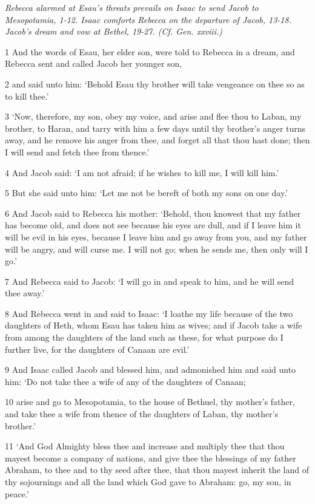 \par \textit{Rebecca alarmed at Esau's threats prevails on Isaac to send Jacob to Mesopotamia, 1-12. Isaac comforts Rebecca on the departure of Jacob, 13-18. Jacob's dream and vow at Bethel, 19-27. (Cf. Gen. xxviii.)}

\par 1 And the words of Esau, her elder son, were told to Rebecca in a dream, and Rebecca sent and called Jacob her younger son,
\par 2 and said unto him: ‘Behold Esau thy brother will take vengeance on thee so as to kill thee.’
\par 3 ‘Now, therefore, my son, obey my voice, and arise and flee thou to Laban, my brother, to Haran, and tarry with him a few days until thy brother's anger turns away, and he remove his anger from thee, and forget all that thou hast done; then I will send and fetch thee from thence.’
\par 4 And Jacob said: ‘I am not afraid; if he wishes to kill me, I will kill him.’
\par 5 But she said unto him: ‘Let me not be bereft of both my sons on one day.’
\par 6 And Jacob said to Rebecca his mother: ‘Behold, thou knowest that my father has become old, and does not see because his eyes are dull, and if I leave him it will be evil in his eyes, because I leave him and go away from you, and my father will be angry, and will curse me. I will not go; when he sends me, then only will I go.’
\par 7 And Rebecca said to Jacob: ‘I will go in and speak to him, and he will send thee away.’
\par 8 And Rebecca went in and said to Isaac: ‘I loathe my life because of the two daughters of Heth, whom Esau has taken him as wives; and if Jacob take a wife from among the daughters of the land such as these, for what purpose do I further live, for the daughters of Canaan are evil.’
\par 9 And Isaac called Jacob and blessed him, and admonished him and said unto him: ‘Do not take thee a wife of any of the daughters of Canaan;
\par 10 arise and go to Mesopotamia, to the house of Bethuel, thy mother's father, and take thee a wife from thence of the daughters of Laban, thy mother's brother.’
\par 11 ‘And God Almighty bless thee and increase and multiply thee that thou mayest become a company of nations, and give thee the blessings of my father Abraham, to thee and to thy seed after thee, that thou mayest inherit the land of thy sojournings and all the land which God gave to Abraham: go, my son, in peace.’
